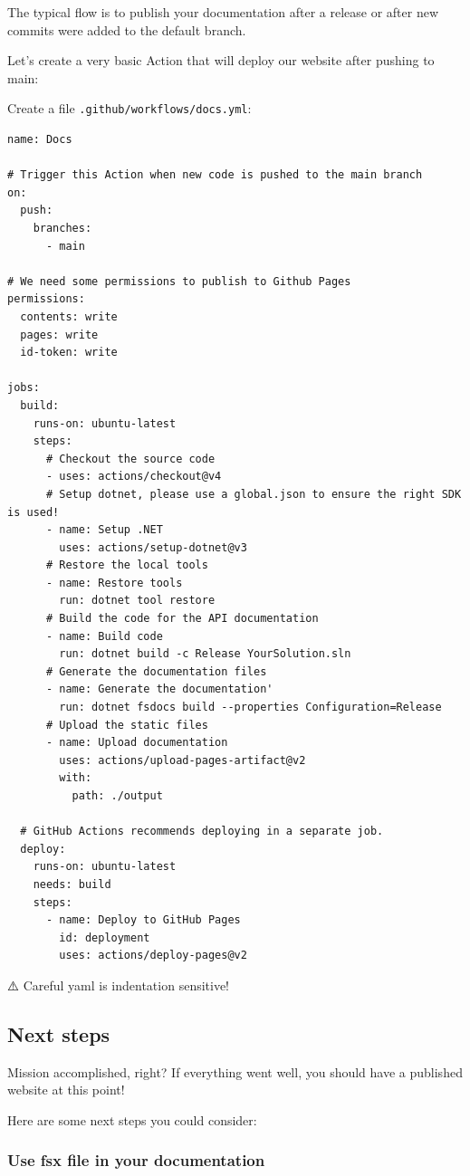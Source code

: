 \documentclass{article}
\begin{document}
The typical flow is to publish your documentation after a release or after new commits were added to the default branch.

Let's create a very basic Action that will deploy our website after pushing to main:


Create a file \texttt{.github/workflows/docs.yml}:
\begin{lstlisting}
name: Docs

# Trigger this Action when new code is pushed to the main branch
on:
  push:
    branches:
      - main

# We need some permissions to publish to Github Pages
permissions:
  contents: write
  pages: write
  id-token: write

jobs:
  build:
    runs-on: ubuntu-latest
    steps:
      # Checkout the source code
      - uses: actions/checkout@v4
      # Setup dotnet, please use a global.json to ensure the right SDK is used!
      - name: Setup .NET
        uses: actions/setup-dotnet@v3
      # Restore the local tools
      - name: Restore tools
        run: dotnet tool restore
      # Build the code for the API documentation
      - name: Build code
        run: dotnet build -c Release YourSolution.sln
      # Generate the documentation files
      - name: Generate the documentation'
        run: dotnet fsdocs build --properties Configuration=Release
      # Upload the static files
      - name: Upload documentation
        uses: actions/upload-pages-artifact@v2
        with:
          path: ./output
  
  # GitHub Actions recommends deploying in a separate job.
  deploy:
    runs-on: ubuntu-latest
    needs: build
    steps:
      - name: Deploy to GitHub Pages
        id: deployment
        uses: actions/deploy-pages@v2

\end{lstlisting}


⚠️ Careful yaml is indentation sensitive!
\subsection*{Next steps}



Mission accomplished, right? If everything went well, you should have a published website at this point!

Here are some next steps you could consider:
\subsubsection*{Use fsx file in your documentation}
\end{document}
